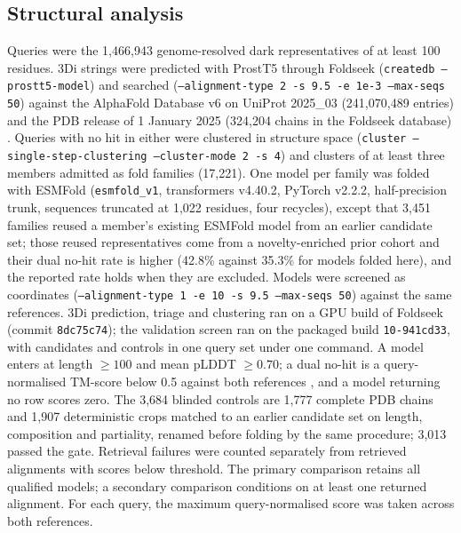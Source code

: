 \documentclass[11pt]{article}
\begin{document}
\subsection*{Structural analysis}
Queries were the 1{,}466{,}943 genome-resolved dark representatives of at least 100 residues. 3Di
strings were predicted with ProstT5 \citep{heinzinger2024prostt5} through Foldseek
\citep{vankempen2024foldseek} (\texttt{createdb --prostt5-model}) and searched
(\texttt{--alignment-type 2 -s 9.5 -e 1e-3 --max-seqs 50}) against the AlphaFold Database v6 on
UniProt 2025\_03 (241{,}070{,}489 entries) \citep{varadi2024alphafolddb} and the PDB release of 1
January 2025 (324{,}204 chains in the Foldseek database) \citep{berman2000pdb}. Queries with no hit
in either were clustered in structure space (\texttt{cluster --single-step-clustering --cluster-mode
2 -s 4}) and clusters of at least three members admitted as fold families (17{,}221). One model per
family was folded with ESMFold \citep{lin2023esmfold} (\texttt{esmfold\_v1}, transformers v4.40.2,
PyTorch v2.2.2, half-precision trunk, sequences truncated at 1{,}022 residues, four recycles), except
that 3{,}451 families reused a member's existing ESMFold model from an earlier candidate set; those
reused representatives come from a novelty-enriched prior cohort and their dual no-hit rate is higher
(42.8\% against 35.3\% for models folded here), and the reported rate holds when they are excluded.
Models were screened as coordinates (\texttt{--alignment-type 1 -e 10 -s 9.5 --max-seqs 50})
against the same references. 3Di prediction, triage and clustering ran on a GPU build of Foldseek
(commit \texttt{8dc75c74}); the validation screen ran on the packaged build \texttt{10-941cd33},
with candidates and controls in one query set under one command. A model enters at length
$\geq 100$ and mean pLDDT $\geq 0.70$; a dual no-hit is a query-normalised TM-score below 0.5 against
both references \citep{zhang2004tmscore}, and a
model returning no row scores zero. The 3{,}684 blinded controls are 1{,}777 complete PDB chains and
1{,}907 deterministic crops matched to an earlier candidate set on length, composition and
partiality, renamed before folding by the same procedure; 3{,}013 passed the gate. Retrieval failures were counted separately from retrieved alignments with scores below threshold.
The primary comparison retains all qualified models; a secondary comparison conditions on at least
one returned alignment. For each query, the maximum query-normalised score was taken across both references.
\end{document}
